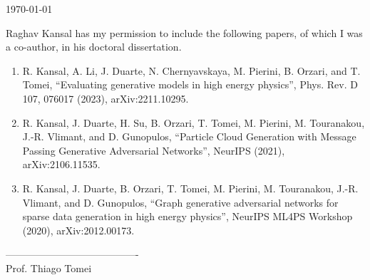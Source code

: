 \documentclass{article}
\begin{document}
\today

Raghav Kansal has my permission to include the following papers, of which
I was a co-author, in his doctoral dissertation.

\begin{enumerate}
    \item R. Kansal, A. Li, J. Duarte, N. Chernyavskaya, M. Pierini, B. Orzari, and T. Tomei, “Evaluating generative models in high energy physics”, Phys. Rev. D 107, 076017 (2023), arXiv:2211.10295.
    \item R. Kansal, J. Duarte, H. Su, B. Orzari, T. Tomei, M. Pierini, M. Touranakou, J.-R. Vlimant, and D. Gunopulos, “Particle Cloud Generation with Message Passing Generative Adversarial Networks”, NeurIPS (2021), arXiv:2106.11535.
    \item R. Kansal, J. Duarte, B. Orzari, T. Tomei, M. Pierini, M. Touranakou, J.-R. Vlimant, and D. Gunopulos, “Graph generative adversarial networks for sparse data generation in high energy physics”, NeurIPS ML4PS Workshop (2020), arXiv:2012.00173.
\end{enumerate}

\baselineskip
----------------------------------------\\
Prof. Thiago Tomei
\end{document}
